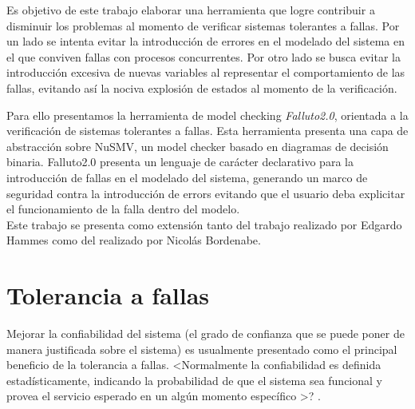 \documentclass[titlepage, 12pt]{book}
\begin{document}
Es objetivo de este trabajo elaborar una herramienta que logre contribuir a disminuir los problemas al momento de verificar sistemas tolerantes a fallas. Por un lado se intenta evitar la introducci\'on de errores en el modelado del sistema en el que conviven fallas con procesos concurrentes. Por otro lado se busca evitar la introducci\'on excesiva de nuevas variables al representar el comportamiento de las fallas, evitando as\'i la nociva explosi\'on de estados al momento de la verificaci\'on.

Para ello presentamos la herramienta de model checking \emph{Falluto2.0}, orientada a la verificaci\'on de sistemas tolerantes a fallas. Esta herramienta presenta una capa de abstracci\'on sobre NuSMV\cite{NuSMV}, un model checker basado en diagramas de decisi\'on binaria. Falluto2.0 presenta un lenguaje de car\'acter declarativo para la introducci\'on de fallas en el modelado del sistema, generando un marco de seguridad contra la introducci\'on de errors evitando que el usuario deba explicitar el funcionamiento de la falla dentro del modelo.\\Este trabajo se presenta como extensi\'on tanto del trabajo realizado por Edgardo Hammes\cite{Falluto1} como del realizado por Nicol\'as Bordenabe\cite{Offbeat}.









\chapter{Tolerancia a fallas}

Mejorar la confiabilidad del sistema (el grado de confianza que se puede poner 
de manera justificada sobre el sistema) es usualmente presentado como el 
principal beneficio de la tolerancia a fallas. <Normalmente la confiabilidad es 
definida estad\'isticamente, indicando la probabilidad de que el sistema sea 
funcional y provea el servicio esperado en un alg\'un momento espec\'ifico >?
\cite{Felix}.




\end{document}

